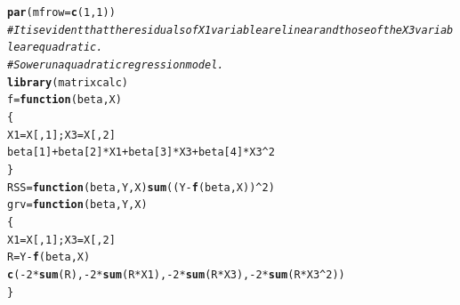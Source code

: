 \documentclass{article}\usepackage[]{graphicx}\usepackage[]{color}
\makeatletter
\newcommand{\hlnum}[1]{\textcolor[rgb]{0.686,0.059,0.569}{#1}}%
\newcommand{\hlcom}[1]{\textcolor[rgb]{0.678,0.584,0.686}{\textit{#1}}}%
\newcommand{\hlopt}[1]{\textcolor[rgb]{0,0,0}{#1}}%
\newcommand{\hlstd}[1]{\textcolor[rgb]{0.345,0.345,0.345}{#1}}%
\newcommand{\hlkwa}[1]{\textcolor[rgb]{0.161,0.373,0.58}{\textbf{#1}}}%
\newcommand{\hlkwb}[1]{\textcolor[rgb]{0.69,0.353,0.396}{#1}}%
\newcommand{\hlkwc}[1]{\textcolor[rgb]{0.333,0.667,0.333}{#1}}%
\newcommand{\hlkwd}[1]{\textcolor[rgb]{0.737,0.353,0.396}{\textbf{#1}}}%
\newenvironment{kframe}{%
 \def\at@end@of@kframe{}%
 \ifinner\ifhmode%
  \def\at@end@of@kframe{\end{minipage}}%
  \begin{minipage}{\columnwidth}%
 \fi\fi%
 \def\FrameCommand##1{\hskip\@totalleftmargin \hskip-\fboxsep
 \colorbox{shadecolor}{##1}\hskip-\fboxsep
     \hskip-\linewidth \hskip-\@totalleftmargin \hskip\columnwidth}%
 \MakeFramed {\advance\hsize-\width
   \@totalleftmargin\z@ \linewidth\hsize
   \@setminipage}}%
 {\par\unskip\endMakeFramed%
 \at@end@of@kframe}
\newenvironment{knitrout}{}{} %
\makeatother
\begin{document}
\begin{knitrout}
{}


\begin{kframe}\begin{alltt}
\hlkwd{par}\hlstd{(}\hlkwc{mfrow}\hlstd{=}\hlkwd{c}\hlstd{(}\hlnum{1}\hlstd{,}\hlnum{1}\hlstd{))}
\hlcom{# It is evident that the residuals of X1 variable are linear and those of the X3 variable are quadratic.}
\hlcom{# So we run a quadratic regression model. }
\hlkwd{library}\hlstd{(matrixcalc)}
\hlstd{f} \hlkwb{=} \hlkwa{function}\hlstd{(}\hlkwc{beta}\hlstd{,}\hlkwc{X}\hlstd{)}
\hlstd{\{}
  \hlstd{X1} \hlkwb{=} \hlstd{X[,}\hlnum{1}\hlstd{]; X3} \hlkwb{=} \hlstd{X[,}\hlnum{2}\hlstd{]}
  \hlstd{beta[}\hlnum{1}\hlstd{]} \hlopt{+} \hlstd{beta[}\hlnum{2}\hlstd{]}\hlopt{*}\hlstd{X1} \hlopt{+} \hlstd{beta[}\hlnum{3}\hlstd{]}\hlopt{*}\hlstd{X3} \hlopt{+} \hlstd{beta[}\hlnum{4}\hlstd{]}\hlopt{*}\hlstd{X3}\hlopt{^}\hlnum{2}
\hlstd{\}}
\hlstd{RSS} \hlkwb{=} \hlkwa{function}\hlstd{(}\hlkwc{beta}\hlstd{,}\hlkwc{Y}\hlstd{,}\hlkwc{X}\hlstd{)} \hlkwd{sum}\hlstd{((Y}\hlopt{-}\hlkwd{f}\hlstd{(beta,X))}\hlopt{^}\hlnum{2}\hlstd{)}
\hlstd{grv} \hlkwb{=} \hlkwa{function}\hlstd{(}\hlkwc{beta}\hlstd{,}\hlkwc{Y}\hlstd{,}\hlkwc{X}\hlstd{)}
\hlstd{\{}
  \hlstd{X1} \hlkwb{=} \hlstd{X[,}\hlnum{1}\hlstd{]; X3} \hlkwb{=} \hlstd{X[,}\hlnum{2}\hlstd{]}
  \hlstd{R} \hlkwb{=} \hlstd{Y} \hlopt{-} \hlkwd{f}\hlstd{(beta,X)}
  \hlkwd{c}\hlstd{(}\hlopt{-}\hlnum{2}\hlopt{*}\hlkwd{sum}\hlstd{(R),} \hlopt{-}\hlnum{2}\hlopt{*}\hlkwd{sum}\hlstd{(R}\hlopt{*}\hlstd{X1),} \hlopt{-}\hlnum{2}\hlopt{*}\hlkwd{sum}\hlstd{(R}\hlopt{*}\hlstd{X3),} \hlopt{-}\hlnum{2}\hlopt{*}\hlkwd{sum}\hlstd{(R}\hlopt{*}\hlstd{X3}\hlopt{^}\hlnum{2}\hlstd{))}
\hlstd{\}}


\end{alltt}
\end{kframe}
\end{knitrout}
\end{document}
